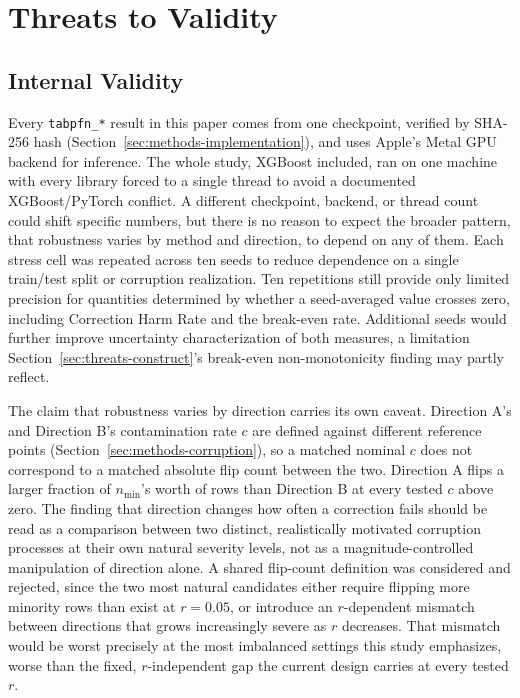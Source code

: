 \section{Threats to Validity}
\label{sec:threats}

\subsection{Internal Validity}
\label{sec:threats-internal}

Every \texttt{tabpfn\_*} result in this paper comes from one checkpoint,
verified by SHA-256 hash (Section~\ref{sec:methods-implementation}),
and uses Apple's Metal GPU backend for inference. The whole study,
XGBoost included, ran on one machine
with every library forced to a single thread to avoid a documented
XGBoost/PyTorch conflict. A different checkpoint, backend, or thread
count could shift specific numbers, but there is no reason to expect
the broader pattern, that robustness varies by method and direction,
to depend on any of them. Each stress cell was repeated across ten
seeds to reduce dependence on a single train/test split or
corruption realization. Ten repetitions still provide only limited
precision for quantities determined by whether a
seed-averaged value crosses zero, including Correction Harm Rate and
the break-even rate. Additional seeds would further improve
uncertainty characterization of both measures, a limitation
Section~\ref{sec:threats-construct}'s break-even non-monotonicity
finding may partly reflect.

The claim that robustness varies by direction carries its own caveat.
Direction A's and Direction B's contamination rate $c$ are defined against
different reference points (Section~\ref{sec:methods-corruption}), so a
matched nominal $c$ does not correspond to a matched absolute flip count
between the two. Direction A flips a larger fraction of $n_{\min}$'s worth
of rows than Direction B at every tested $c$ above zero. The finding that
direction changes how often a correction fails should be read as a
comparison between two distinct, realistically motivated corruption
processes at their own natural severity levels, not as a
magnitude-controlled manipulation of direction alone. A shared flip-count
definition was considered and rejected, since the two most natural
candidates either require flipping more minority rows than exist at
$r{=}0.05$, or introduce an $r$-dependent mismatch between directions
that grows increasingly severe as $r$ decreases. That mismatch would be
worst precisely at the most imbalanced settings this study emphasizes,
worse than the fixed, $r$-independent gap the current design carries at
every tested $r$.

